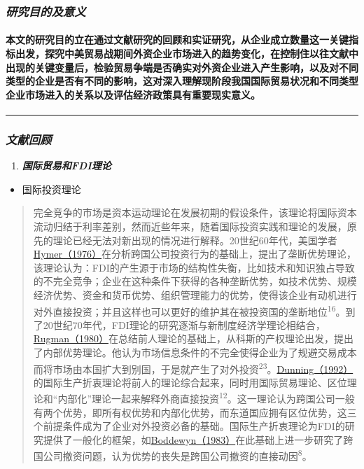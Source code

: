 \documentclass[]{article}
\providecommand{\tightlist}{%
  \setlength{\itemsep}{0pt}\setlength{\parskip}{0pt}}
\let\oldparagraph\paragraph
\renewcommand{\paragraph}[1]{\oldparagraph{#1}\mbox{}}
\begin{document}
\hypertarget{section-8}{%
\subsubsection{\texorpdfstring{\textbf{\emph{研究目的及意义}}}{研究目的及意义}}\label{section-8}}

\hypertarget{section-9}{%
\paragraph{本文的研究目的立在通过文献研究的回顾和实证研究，从企业成立数量这一关键指标出发，探究中美贸易战期间外资企业市场进入的趋势变化，在控制住以往文献中出现的关键变量后，检验贸易争端是否确实对外资企业进入产生影响，以及对不同类型的企业是否有不同的影响，这对深入理解现阶段我国国际贸易状况和不同类型企业市场进入的关系以及评估经济政策具有重要现实意义。}\label{section-9}}

\begin{center}\rule{0.5\linewidth}{\linethickness}\end{center}

\hypertarget{section-10}{%
\subsubsection{\texorpdfstring{\textbf{\emph{文献回顾}}}{文献回顾}}\label{section-10}}

\begin{enumerate}
\def\labelenumi{\arabic{enumi}.}
\tightlist
\item
  \textbf{\emph{国际贸易和FDI理论}}
\end{enumerate}

\begin{itemize}
\tightlist
\item
  国际投资理论
\end{itemize}

\begin{quote}
完全竞争的市场是资本运动理论在发展初期的假设条件，该理论将国际资本流动归结于利率差别，然而近些年来，随着国际投资实践和理论的发展，原先的理论已经无法对新出现的情况进行解释。20世纪60年代，美国学者\href{www.baidu.com}{Hymer（1976）}在分析跨国公司投资行为的基础上，提出了垄断优势理论，该理论认为：FDI的产生源于市场的结构性失衡，比如技术和知识独占导致的不完全竞争；企业在这种条件下获得的各种垄断优势，如技术优势、规模经济优势、资金和货币优势、组织管理能力的优势，使得该企业有动机进行对外直接投资；并且这样也可以更好的维护其在被投资国的垄断地位\textsuperscript{16}。到了20世纪70年代，FDI理论的研究逐渐与新制度经济学理论相结合，\href{www.baidu.com}{Rugman（1980）}在总结前人理论的基础上，从科斯的产权理论出发，提出了内部优势理论。他认为市场信息条件的不完全使得企业为了规避交易成本而将市场由本国扩大到别国，于是就产生了对外投资\textsuperscript{23}。\href{www.baidu.com}{Dunning（1992）}的国际生产折衷理论将前人的理论综合起来，同时用国际贸易理论、区位理论和``内部化''理论一起来解释外商直接投资\textsuperscript{12}。这一理论认为跨国公司一般有两个优势，即所有权优势和内部化优势，而东道国应拥有区位优势，这三个前提条件成为了企业对外投资必备的基础。国际生产折衷理论为FDI的研究提供了一般化的框架，如\href{www.baidu.com}{Boddewyn（1983）}在此基础上进一步研究了跨国公司撤资问题，认为优势的丧失是跨国公司撤资的直接动因\textsuperscript{8}。
\end{quote}
\end{document}

